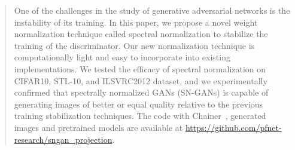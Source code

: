 \begin{abstract}
One of the challenges in the study of generative adversarial networks is the instability of its training. 
In this paper, we propose a novel weight normalization technique called spectral normalization to stabilize the training of the discriminator.
Our new normalization technique is computationally light and easy to incorporate into existing implementations. 
We tested the efficacy of spectral normalization on CIFAR10, STL-10, and ILSVRC2012 dataset, and we experimentally confirmed that spectrally normalized GANs (SN-GANs) is capable of generating images of better or equal quality relative to the previous training stabilization techniques.  
The code with Chainer~\cite[]{tokui2015chainer}, generated images and pretrained models are available at \url{https://github.com/pfnet-research/sngan_projection}.
\end{abstract}